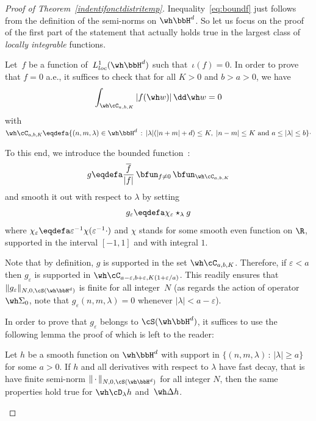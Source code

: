 \begin{proof}[Proof of Theorem~\ref{indentifonctdistritemp}]
Inequality~\eqref{eq:boundf} just follows from the definition of the semi-norms on $\wh \bbH^d$. So let us focus on the proof of the first part of the statement that actually holds true in the largest class of \emph{locally integrable} functions.

Let~$f$ be a function of~$ L^1_{loc}(\wh \bbH^d) $ such that~$\iota(f)=0$. In order to prove that $f=0$ a.e., it suffices to check that for all $K>0$ and $b>a>0$, we have
\[
\int_{\wh\cC_{a,b,K}}|f(\wh w)|\,\dd\wh w=0
\]
with $\wh\cC_{a,b,K}\eqdefa\{(n,m,\lambda)\in\wh\bbH^d\,:\, |\lambda|(|n+m|+d)\leq K,\; |n-m|\leq K \ \hbox{and}\ a\leq|\lambda|\leq b \}\cdotp$

To this end, we introduce the bounded function~:
\[
g\eqdefa \frac {\overline f}{|f|}\,\bfun_{f\not=0}\,\bfun_{\wh\cC_{a,b,K}}
\]
and smooth it out with respect to $\lambda$ by setting
\[
g_{\varepsilon} \eqdefa \chi_{\varepsilon}\star_\lambda g
\]
where $\chi_\varepsilon\eqdefa\varepsilon^{-1}\chi(\varepsilon^{-1}\cdot)$ and $\chi$ stands for some smooth even function on $\R$, supported in the interval $[-1,1]$ and with integral $1$.

Note that by definition, $g$ is supported in the set $\wh\cC_{a,b,K}$. Therefore, if $\varepsilon<a$ then $g_\varepsilon$ is supported in $\wh\cC_{a-\varepsilon,b+\varepsilon,K(1+\varepsilon/a)}$. This readily ensures that $\|g_\varepsilon\|_{N,0,\cS(\wh\bbH^d)}$ is finite for all integer~$N$ (as regards the action of operator $\wh\Sigma_0$, note that $g_\varepsilon(n,m,\lambda)=0$ whenever $|\lambda|<a-\varepsilon$).

In order to prove that $g_\varepsilon$ belongs to $\cS(\wh\bbH^d)$, it suffices to use the following lemma the proof of which is left to the reader:

\begin{lemm}
Let $h$ be a smooth function on $\wh\bbH^d$ with support in $\{(n,m,\lambda)\,:\, |\lambda|\geq a\}$ for some $a>0$. If $h$ and all derivatives with respect to $\lambda$ have fast decay, that is have finite semi-norm $\|{\,\cdot\,}\|_{N,0,\cS(\wh\bbH^d)}$ for all integer $N$, then the same properties hold true for $\wh\cD_\lambda h$ and~$\wh\Delta h$.
\end{lemm}


\end{proof}
